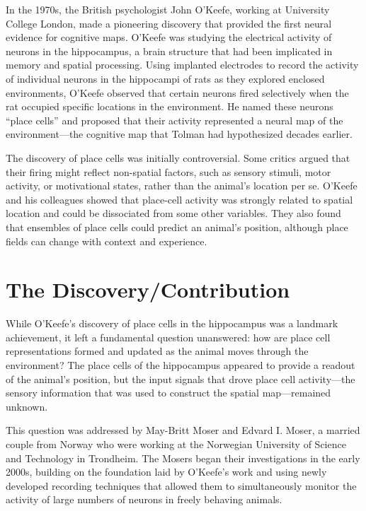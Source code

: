 In the 1970s, the British psychologist John O'Keefe, working at University College London, made a pioneering discovery that provided the first neural evidence for cognitive maps. O'Keefe was studying the electrical activity of neurons in the hippocampus, a brain structure that had been implicated in memory and spatial processing. Using implanted electrodes to record the activity of individual neurons in the hippocampi of rats as they explored enclosed environments, O'Keefe observed that certain neurons fired selectively when the rat occupied specific locations in the environment. He named these neurons ``place cells'' and proposed that their activity represented a neural map of the environment---the cognitive map that Tolman had hypothesized decades earlier.

The discovery of place cells was initially controversial. Some critics argued that their firing might reflect non-spatial factors, such as sensory stimuli, motor activity, or motivational states, rather than the animal's location per se. O'Keefe and his colleagues showed that place-cell activity was strongly related to spatial location and could be dissociated from some other variables. They also found that ensembles of place cells could predict an animal's position, although place fields can change with context and experience.

\section{The Discovery/Contribution}

While O'Keefe's discovery of place cells in the hippocampus was a landmark achievement, it left a fundamental question unanswered: how are place cell representations formed and updated as the animal moves through the environment? The place cells of the hippocampus appeared to provide a readout of the animal's position, but the input signals that drove place cell activity---the sensory information that was used to construct the spatial map---remained unknown.

This question was addressed by May-Britt Moser and Edvard I. Moser, a married couple from Norway who were working at the Norwegian University of Science and Technology in Trondheim. The Mosers began their investigations in the early 2000s, building on the foundation laid by O'Keefe's work and using newly developed recording techniques that allowed them to simultaneously monitor the activity of large numbers of neurons in freely behaving animals.

